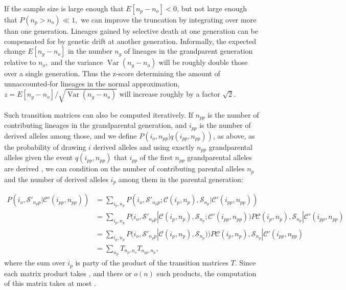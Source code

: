 \documentclass[review]{elsarticle}
\newcommand{\sgcomment}[1]{{\color{red}{SG: #1}}}
\begin{document}
If the sample size is large enough that $E[n_p-n_o]<0$, but not large enough that $P(n_p>n_o) \ll 1,$
we can improve the truncation by integrating over more than one generation. 
Lineages gained by 
selective death at one generation can be compensated for by genetic drift at another generation.
Informally, the expected change $E[n_g-n_o]$ in the number $n_g$ of lineages in the grandparent generation relative  
to $n_o,$  and the variance
$\operatorname{Var}(n_g-n_o)$ will be roughly double those over a single generation. Thus the z-score 
determining the amount of unnaccounted-for lineages in the normal approximation, $z= E[n_g-n_o] / \sqrt{\operatorname{Var}(n_g-n_o)}$
 will increase roughly by a factor $\sqrt{2}$. 

Such transition matrices can also be computed iteratively. If $n_{pp}$ is the number of contributing
lineages in the grandparental generation, and $i_{pp}$ is the number of derived alleles among those, and we
define $P(i_o, n_{pp} | q(i_{pp}, n_{pp}))$, as above, as the probability of drawing $i$ derived alleles and
using exactly $n_{pp}$ grandparental alleles given the event $q(i_{pp}, n_{pp})$ that $i_{pp}$ of the first $n_{pp}$
grandparental alleles are derived \sgcomment{We would need to reconcile the notation here with the previous one}, 
we can condition on the number of contributing parental alleles $n_p$ and
the number of derived alleles $i_p$ among them in the parental generation: \sgcomment{define $S'$}
 
 \begin{equation}
 \begin{split}
 P(i_o, \mathcal{S}'_{n_pp} | \mathcal{C}'(i_{pp}, n_{pp})) & = \sum_{i_p,n_p} P(i_o, \mathcal{S}'_{n_pp} ; \mathcal{C}(i_p,n_p), \mathcal{S}_{n_p} | \mathcal{C}'(i_{pp}, n_{pp}))\\
 &= \sum_{i_p,n_p}  P(i_o, \mathcal{S}'_{n_pp} | \mathcal{C}(i_p,n_p), \mathcal{S}_{n_p} ; \mathcal{C}'(i_{pp}, n_{pp})) P\mathcal{C}(i_p,n_p), \mathcal{S}_{n_p} | \mathcal{C}'(i_{pp}, n_{pp}) \\
 &=  \sum_{i_p,n_p}  P(i_o, \mathcal{S}'_{n_pp} | \mathcal{C}(i_p,n_p), \mathcal{S}_{n_p})) P\mathcal{C}(i_p,n_p), \mathcal{S}_{n_p} | \mathcal{C}'(i_{pp}, n_{pp}) \\
 &=   \sum_{n_p} T_{n_p,n_o} T_{n_{pp}, n_p},
 \end{split}
\end{equation}
where the sum over $i_p$ is party of the product of the transition matrices $T$. 
Since each matrix product takes \sgcomment{scaling of practical matrix product algos}, and there or $o(n)$
such products, the computation of this matrix takes at most \sgcomment{...}.
\end{document}
